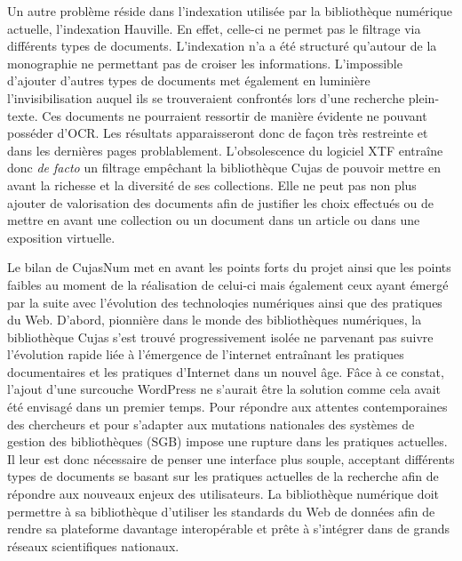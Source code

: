 Un autre problème réside dans l'indexation utilisée par la bibliothèque numérique actuelle, l'indexation Hauville. En effet, celle-ci ne permet pas le filtrage via différents types de documents. L'indexation n'a a été structuré qu'autour de la monographie ne permettant pas de croiser les informations. L'impossible d'ajouter d'autres types de documents met également en luminière l'invisibilisation auquel ils se trouveraient confrontés lors d'une recherche plein-texte. Ces documents ne pourraient ressortir de manière évidente ne pouvant posséder d'OCR. Les résultats apparaisseront donc de façon très restreinte et dans les dernières pages problablement. L'obsolescence du logiciel XTF entraîne donc \textit{de facto} un filtrage empêchant la bibliothèque Cujas de pouvoir mettre en avant la richesse et la diversité de ses collections. Elle ne peut pas non plus ajouter de valorisation des documents afin de justifier les choix effectués ou de mettre en avant une collection ou un document dans un article ou dans une exposition virtuelle. 
\medskip

Le bilan de CujasNum met en avant les points forts du projet ainsi que les points faibles au moment de la réalisation de celui-ci mais également ceux ayant émergé par la suite avec l'évolution des technoloqies numériques ainsi que des pratiques du Web. D'abord, pionnière dans le monde des bibliothèques numériques, la bibliothèque Cujas s'est trouvé progressivement isolée ne parvenant pas suivre l'évolution rapide liée à l'émergence de l'internet entraînant les pratiques documentaires et les pratiques d'Internet dans un nouvel âge. Fâce à ce constat, l'ajout d'une surcouche WordPress ne s'aurait être la solution comme cela avait été envisagé dans un premier temps. Pour répondre aux attentes contemporaines des chercheurs et pour s'adapter aux mutations nationales des systèmes de gestion des bibliothèques (SGB) impose une rupture dans les pratiques actuelles. Il leur est donc nécessaire de penser une interface plus souple, acceptant différents types de documents se basant sur les pratiques actuelles de la recherche afin de répondre aux nouveaux enjeux des utilisateurs. La bibliothèque numérique doit permettre à sa bibliothèque d'utiliser les standards du Web de données afin de rendre sa plateforme davantage interopérable et prête à s'intégrer dans de grands réseaux scientifiques nationaux.